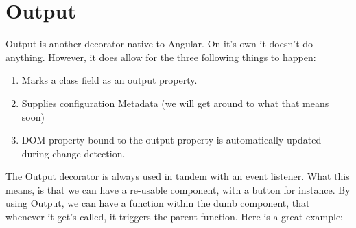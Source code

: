 \maketitle{}
\section{ Output }

Output is another decorator native to Angular. On it's own it doesn't do
anything. However, it does allow for the three following things to happen:
\begin{enumerate}
  \item Marks a class field as an output property.
  \item Supplies configuration Metadata (we will get around to what that means
  soon)
  \item DOM property bound to the output property is automatically updated
  during change detection.
\end{enumerate}

The Output decorator is always used in tandem with an event listener. What this
means, is that we can have a re-usable component, with a button for instance.
By using Output, we can have a function within the dumb component, that whenever
it get's called, it triggers the parent function. Here is a great example:

\begin{lstlisting}
\end{lstlisting}
